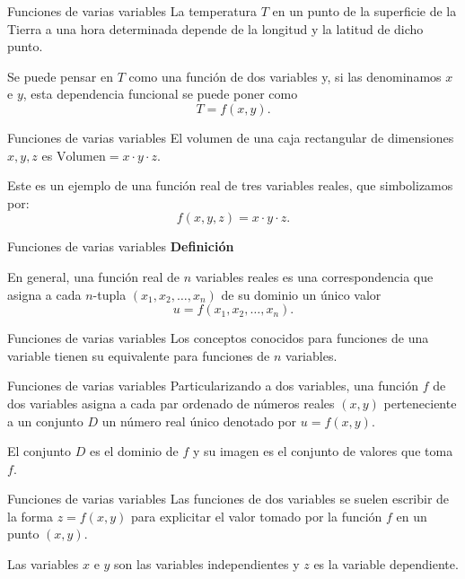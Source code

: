 \documentclass[original_version/main.tex]{subfiles}
\begin{document}
\graphicspath{{imagenes/tema1/}{../imagenes/tema1/}}

\begin{frame}{Funciones de varias variables}
La temperatura $T$ en un punto de la superficie de la Tierra a una hora determinada depende de la longitud y la latitud de dicho punto.
\medskip

Se puede pensar en $T$ como una función de dos variables y, si las denominamos $x$ e $y$, esta dependencia funcional se puede poner como
\[T=f(x,y).\]
\end{frame}
\begin{frame}{Funciones de varias variables}
El volumen de una caja rectangular de dimensiones $x,y,z$ es $\text{Volumen}=x\cdot y\cdot z$.
\medskip

Este es un ejemplo de una función real de tres variables reales, que simbolizamos por:
\[f(x,y,z)=x\cdot y\cdot z.\]
\end{frame}
\begin{frame}{Funciones de varias variables}
\textbf{Definición}
\medskip

En general, una función real de $n$ variables reales es una correspondencia que asigna a cada $n$-tupla $(x_1,x_2,\ldots,x_n)$ de su dominio un único valor
\[u=f(x_1,x_2,\ldots,x_n).\]
\end{frame}
\begin{frame}{Funciones de varias variables}
Los conceptos conocidos para funciones de una variable tienen su equivalente para funciones de $n$ variables.
\end{frame}
\begin{frame}{Funciones de varias variables}
Particularizando a dos variables, una función $f$ de dos variables asigna a cada par ordenado de números reales $(x,y)$ perteneciente a un conjunto $D$ un número real único denotado por $u=f(x,y)$.
\medskip

El conjunto $D$ es el dominio de $f$ y su imagen es el conjunto de valores que toma $f$.
\end{frame}
\begin{frame}{Funciones de varias variables}
Las funciones de dos variables se suelen escribir de la forma $z=f(x,y)$ para explicitar el valor tomado por la función $f$ en un punto $(x,y)$.
\medskip

Las variables $x$ e $y$ son las variables independientes y $z$ es la variable dependiente.
\end{frame}
\end{document}
